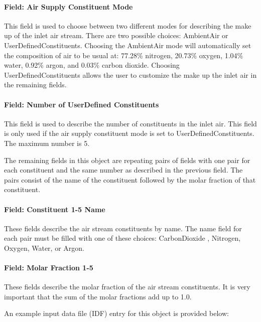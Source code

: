 \paragraph{Field: Air Supply Constituent Mode}\label{field-air-supply-constituent-mode}

This field is used to choose between two different modes for describing the make up of the inlet air stream. There are two possible choices: AmbientAir or UserDefinedConstituents. Choosing the AmbientAir mode will automatically set the composition of air to be usual at: 77.28\% nitrogen, 20.73\% oxygen, 1.04\% water, 0.92\% argon, and 0.03\% carbon dioxide. Choosing UserDefinedConstituents allows the user to customize the make up the inlet air in the remaining fields.

\paragraph{Field: Number of UserDefined Constituents}\label{field-number-of-userdefined-constituents}

This field is used to describe the number of constituents in the inlet air. This field is only used if the air supply constituent mode is set to UserDefinedConstituents. The maximum number is 5.

The remaining fields in this object are repeating pairs of fields with one pair for each constituent and the same number as described in the previous field. The pairs consist of the name of the constituent followed by the molar fraction of that constituent.

\paragraph{Field: Constituent 1-5 Name}\label{field-constituent-1-5-name}

These fields describe the air stream constituents by name. The name field for each pair must be filled with one of these choices: CarbonDioxide , Nitrogen, Oxygen, Water, or Argon.

\paragraph{Field: Molar Fraction 1-5}\label{field-molar-fraction-1-5}

These fields describe the molar fraction of the air stream constituents. It is very important that the sum of the molar fractions add up to 1.0.

An example input data file (IDF) entry for this object is provided below:

